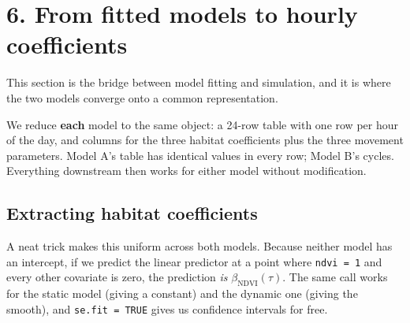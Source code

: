 \documentclass[
  letterpaper,
  DIV=11,
  numbers=noendperiod]{scrartcl}
\begin{document}
\section{6. From fitted models to hourly
coefficients}\label{from-fitted-models-to-hourly-coefficients}

This section is the bridge between model fitting and simulation, and it
is where the two models converge onto a common representation.

We reduce \textbf{each} model to the same object: a 24-row table with
one row per hour of the day, and columns for the three habitat
coefficients plus the three movement parameters. Model A's table has
identical values in every row; Model B's cycles. Everything downstream
then works for either model without modification.

\subsection{Extracting habitat
coefficients}\label{extracting-habitat-coefficients}

A neat trick makes this uniform across both models. Because neither
model has an intercept, if we predict the linear predictor at a point
where \texttt{ndvi\ =\ 1} and every other covariate is zero, the
prediction \emph{is} \(\beta_{\text{NDVI}}(\tau)\). The same call works
for the static model (giving a constant) and the dynamic one (giving the
smooth), and \texttt{se.fit\ =\ TRUE} gives us confidence intervals for
free.
\end{document}
